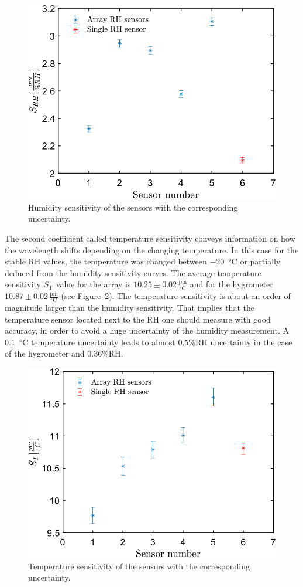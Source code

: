 \begin{figure}[!h]
\centering
\includegraphics[width=0.6\columnwidth]{Chapter5/images/comp1.png}
\caption{Humidity sensitivity of the sensors with the corresponding uncertainty.}
\label{fig_calibration}
\end{figure}
The second coefficient called temperature sensitivity conveys information on how the wavelength shifts depending on the changing temperature. In this case for the stable \gls{RH} values, the temperature was changed between \SI{-20}{\celsius} or partially deduced from the humidity sensitivity curves. 
The average temperature sensitivity $S_\text{T}$ value for the array is $10.25\pm0.02\,\mathrm{\frac{pm}{^{\circ}C}}$ and for the hygrometer $10.87\pm 0.02\,\mathrm{\frac{pm}{^{\circ}C}}$ (see Figure~\ref{fig_calibration1}). The temperature sensitivity is about an order of magnitude larger than the humidity sensitivity. That implies that the temperature sensor located next to the \gls{RH} one should measure with good accuracy, in order to avoid a huge uncertainty of the humidity measurement. A \SI{0.1}{\celsius} temperature uncertainty leads to almost $0.5$\%RH uncertainty in the case of the hygrometer and $0.36$\%RH. 
\begin{figure}[!h]
\centering
\includegraphics[width=0.6\columnwidth]{Chapter5/images/comp.png}
\caption{Temperature sensitivity of the sensors with the corresponding uncertainty.}
\label{fig_calibration1}
\end{figure}


